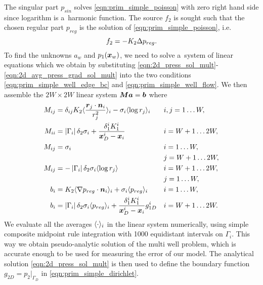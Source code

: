 The singular part $p_{sin}$ solves \eqref{eqn:prim_simple_poisson} with zero right hand side since logarithm is a~harmonic function.
The source $f_2$ is sought such that the chosen regular part $p_{reg}$ is the solution of \eqref{eqn:prim_simple_poisson}, i.e.
\begin{equation}
    f_2 = -K_2 \Delta p_{reg}.
\end{equation}
To find the unknowns $a_w$ and $p_1(\mathbf{\boldsymbol{x}}_w)$, we need to solve a~system of linear equations
which we obtain by substituting \eqref{eqn:2d_press_sol_mult}-\eqref{eqn:2d_avg_press_grad_sol_mult}
into the two conditions \eqref{eqn:prim_simple_well_edge_bc} and \eqref{eqn:prim_simple_well_flow}.
We then assemble the $2W\times 2W$ linear system $\mathbf{\boldsymbol{M}}\mathbf{\boldsymbol{a}} = \mathbf{\boldsymbol{b}}$ where
\begin{subequations}
\label{eqn:2d_press_linear_system}
\begin{align}
M_{ij} &= \delta_{ij} K_2\avg{\frac{\vc r_j \cdot \vc n_i}{r_j^2}}_i - \sigma_i\avg{\log r_j}_i && i,j=1\ldots W, \\
%
M_{ii} &= \abs{\Gamma_i}\delta_2\sigma_i + \frac{\delta^i_1 K^i_1}{\bx^i_D-\bx_i} && i=W+1 \ldots 2W,\\
%
M_{ij} &= \sigma_i && i=1\ldots W,\\
    &&& j=W+1 \ldots 2W,\\
M_{ij} &= -\abs{\Gamma_i}\delta_2\sigma_i \avg{\log r_j} && i=W+1 \ldots 2W,\\
    &&& j=1 \ldots W,\\
b_{i} &= K_2 \avg{\grad p_{reg}\cdot \vc n_i}_i + \sigma_i\avg{p_{reg}}_i && i=1 \ldots W,\\
b_{i} &= \abs{\Gamma_i}\delta_2\sigma_i \avg{p_{reg}}_i + \frac{\delta^i_1 K^i_1}{\bx^i_D-\bx_i}g^i_{1D} && i=W+1\ldots 2W.
\end{align}
\end{subequations}
We evaluate all the averages $\langle\cdot\rangle_i$ in the linear system numerically,
using simple composite midpoint rule integration with 1000 equidistant intervals on $\Gamma_i$.
This way we obtain pseudo-analytic solution of the multi well problem, which is accurate enough
to be used for measuring the error of our model.
The analytical solution \eqref{eqn:2d_press_sol_mult} is then used 
to define the boundary function $g_{2D} = p_2|_{\Gamma_D}$ in \eqref{eqn:prim_simple_dirichlet}.
